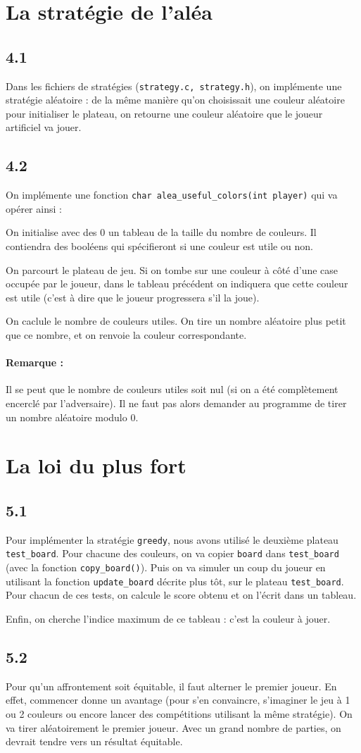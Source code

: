\documentclass[12pt]{article}
\def\question#1{\subsection*{#1}}
\def\sec#1{\section{#1}}
\begin{document}
\sec{La stratégie de l'aléa}
\question{4.1}
Dans les fichiers de stratégies (\texttt{strategy.c, strategy.h}), on implémente une stratégie aléatoire : de la même manière qu'on choisissait une couleur aléatoire pour initialiser le plateau, on retourne une couleur aléatoire que le joueur artificiel va jouer.

\question{4.2}
On implémente une fonction \texttt{char alea\_useful\_colors(int player)} qui va opérer ainsi :

On initialise avec des 0 un tableau de la taille du nombre de couleurs. Il contiendra des booléens qui spécifieront si une couleur est utile ou non.

On parcourt le plateau de jeu. Si on tombe sur une couleur à côté d'une case occupée par le joueur, dans le tableau précédent on indiquera que cette couleur est utile (c'est à dire que le joueur progressera s'il la joue).

On caclule le nombre de couleurs utiles. On tire un nombre aléatoire plus petit que ce nombre, et on renvoie la couleur correspondante.

\paragraph{Remarque :} Il se peut que le nombre de couleurs utiles soit nul (si on a été complètement encerclé par l'adversaire). Il ne faut pas alors demander au programme de tirer un nombre aléatoire modulo 0.

\sec{La loi du plus fort}
\question{5.1}
Pour implémenter la stratégie \texttt{greedy}, nous avons utilisé le deuxième plateau \texttt{test\_board}.
Pour chacune des couleurs, on va copier \texttt{board} dans \texttt{test\_board} (avec la fonction \texttt{copy\_board()}). Puis on va simuler un coup du joueur en utilisant la fonction \texttt{update\_board} décrite plus tôt, sur le plateau \texttt{test\_board}. Pour chacun de ces tests, on calcule le score obtenu et on l'écrit dans un tableau.

Enfin, on cherche l'indice maximum de ce tableau : c'est la couleur à jouer.


\question{5.2}
Pour qu'un affrontement soit équitable, il faut alterner le premier joueur. En effet, commencer donne un avantage (pour s'en convaincre, s'imaginer le jeu à 1 ou 2 couleurs ou encore lancer des compétitions utilisant la même stratégie). On va tirer aléatoirement le premier joueur. Avec un grand nombre de parties, on devrait tendre vers un résultat équitable.
\end{document}
